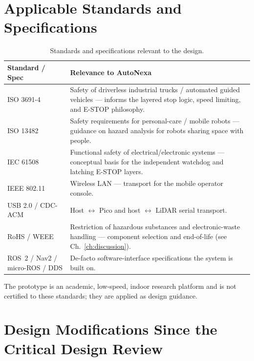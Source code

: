 \documentclass[12pt,a4paper]{report}
\newcommand{\pname}{AutoNexa}
\begin{document}
\section{Applicable Standards and Specifications}

\begin{table}[H]
\centering
\caption{Standards and specifications relevant to the design.}
\label{tab:standards}
\begin{tabularx}{\textwidth}{|p{3.4cm}|X|}
\hline
\textbf{Standard / Spec} & \textbf{Relevance to \pname{}} \\
\hline
ISO 3691-4 & Safety of driverless industrial trucks / automated guided vehicles --- informs the layered stop logic, speed limiting, and E-STOP philosophy. \\
\hline
ISO 13482 & Safety requirements for personal-care / mobile robots --- guidance on hazard analysis for robots sharing space with people. \\
\hline
IEC 61508 & Functional safety of electrical/electronic systems --- conceptual basis for the independent watchdog and latching E-STOP layers. \\
\hline
IEEE 802.11 & Wireless LAN --- transport for the mobile operator console. \\
\hline
USB 2.0 / CDC-ACM & Host $\leftrightarrow$ Pico and host $\leftrightarrow$ LiDAR serial transport. \\
\hline
RoHS / WEEE & Restriction of hazardous substances and electronic-waste handling --- component selection and end-of-life (see Ch.~\ref{ch:discussion}). \\
\hline
ROS~2 / Nav2 / micro-ROS / DDS & De-facto software-interface specifications the system is built on. \\
\hline
\end{tabularx}
\end{table}

\noindent The prototype is an academic, low-speed, indoor research platform and
is not certified to these standards; they are applied as design guidance.

\section{Design Modifications Since the Critical Design Review}
\end{document}
